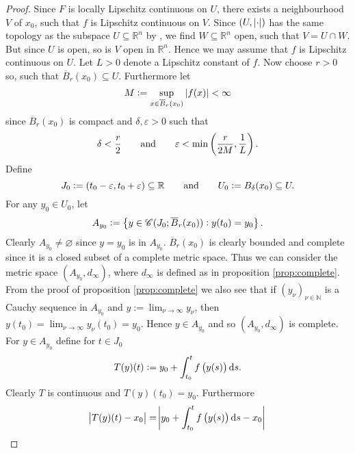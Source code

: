 \begin{proof}
Since $F$ is locally Lipschitz continuous on $U$, there exists a neighbourhood $V$ of $x_0$, such that $f$ is Lipschitz continuous on $V$. Since $(U,\abs[0]{\cdot})$ has the same topology as the subspace $U \subseteq \mathbb{R}^n$ by \cite[50]{lee:topological_manifolds:2011}, we find $W \subseteq \mathbb{R}^n$ open, such that $V = U \cap W$. But since $U$ is open, so is $V$ open in $\mathbb{R}^n$. Hence we may assume that $f$ is Lipschitz continuous on $U$. Let $L > 0$ denote a Lipschitz constant of $f$. Now choose $r > 0$ so, such that $\overline{B}_r(x_0) \subseteq U$. Furthermore let
\begin{equation*}
M := \sup_{x \in \overline{B}_r(x_0)} \abs[0]{f(x)} < \infty
\end{equation*}
\noindent since $\overline{B}_r(x_0)$ is compact and $\delta, \varepsilon > 0$ such that
\begin{equation*}
\delta < \frac{r}{2} \qquad \text{and} \qquad \varepsilon < \min\del[3]{\frac{r}{2M},\frac{1}{L}}.
\end{equation*}
Define 
\begin{equation*}
J_0 := \intoo{t_0 - \varepsilon,t_0 + \varepsilon} \subseteq \mathbb{R} \qquad \text{and} \qquad U_0 := B_\delta(x_0) \subseteq U.
\end{equation*}
For any $y_0 \in U_0$, let
\begin{equation*}
A_{y_0} := \cbr[1]{y \in \Cscr(J_0;\overline{B}_r(x_0)) : y(t_0) = y_0}.
\end{equation*}
Clearly $A_{y_0} \neq \varnothing$ since $y = y_0$ is in $A_{y_0}$. $\overline{B}_r(x_0)$ is clearly bounded and complete since it is a closed subset of a complete metric space. Thus we can consider the metric space $(A_{y_0},d_\infty)$, where $d_\infty$ is defined as in proposition \ref{prop:complete}. From the proof of proposition \ref{prop:complete} we also see that if $(y_\nu)_{\nu \in \mathbb{N}}$ is a Cauchy sequence in $A_{y_0}$ and $y := \lim_{\nu \to \infty}y_\nu$, then $y(t_0) = \lim_{\nu \to \infty}y_\nu(t_0) = y_0$. Hence $y \in A_{y_0}$ and so $(A_{y_0},d_\infty)$ is complete. For $y \in A_{y_0}$ define for $t \in J_0$
\begin{equation*}
T(y)(t) := y_0 + \int_{t_0}^tf\del[1]{y(s)}\d s.
\end{equation*}
Clearly $T$ is continuous and $T(y)(t_0) = y_0$. Furthermore
\begin{align*}
\abs[1]{T(y)(t) - x_0} &= \abs[3]{y_0 + \int_{t_0}^tf\del[1]{y(s)}\d s - x_0}\\

\end{align*}
\end{proof}
